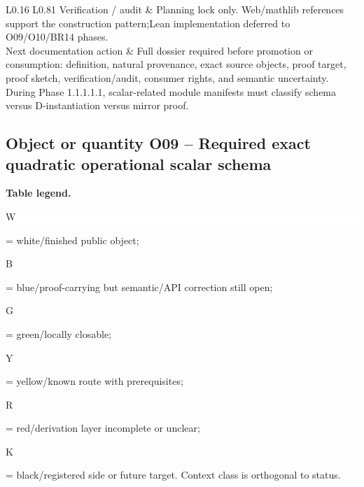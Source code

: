 \begin{longtable}{L{0.16\linewidth} L{0.81\linewidth}}
\hline\addlinespace[0.20em]
Verification /\allowbreak{} audit & Planning lock only. Web/\allowbreak{}mathlib references support the construction pattern;\newline Lean implementation deferred to O09/\allowbreak{}O10/\allowbreak{}BR14 phases.\\
\hline\addlinespace[0.20em]
Next documentation action & Full dossier required before promotion or consumption: definition, natural provenance, exact source objects, proof target, proof sketch, verification/\allowbreak{}audit, consumer rights, and semantic uncertainty. During Phase 1.1.1.1.1, scalar-related module manifests must classify schema versus D-instantiation versus mirror proof.\\
\hline\addlinespace[0.20em]
\end{longtable}
\subsection*{Object or quantity O09 -- Required exact quadratic operational scalar schema}
\hypertarget{objproof:O09}{}
\par\smallskip\noindent\begin{minipage}{0.99\linewidth}\footnotesize\raggedright\textbf{Table legend.} \colorbox{white}{\strut W} = white/finished public object; \colorbox{cyan!20}{\strut B} = blue/proof-carrying but semantic/API correction still open; \colorbox{green!18}{\strut G} = green/locally closable; \colorbox{yellow!25}{\strut Y} = yellow/known route with prerequisites; \colorbox{red!20}{\strut R} = red/derivation layer incomplete or unclear; \colorbox{black!18}{\strut K} = black/registered side or future target. Context class is orthogonal to status.\end{minipage}\par\vspace{0.25em}
